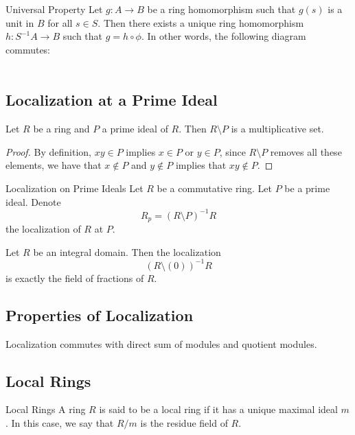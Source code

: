 \documentclass[a4paper]{article}
\begin{document}
\begin{thm}{Universal Property}{} Let $g:A\to B$ be a ring homomorphism such that $g(s)$ is a unit in $B$ for all $s\in S$. Then there exists a unique ring homomorphism $h:S^{-1}A\to B$ such that $g=h\circ\phi$. In other words, the following diagram commutes: \\~\\
\end{thm}

\subsection{Localization at a Prime Ideal}
\begin{lmm}{}{} Let $R$ be a ring and $P$ a prime ideal of $R$. Then $R\setminus P$ is a multiplicative set. \tcbline
\begin{proof}
By definition, $xy\in P$ implies $x\in P$ or $y\in P$, since $R\setminus P$ removes all these elements, we have that $x\notin P$ and $y\notin P$ implies that $xy\notin P$. 
\end{proof}
\end{lmm}

\begin{defn}{Localization on Prime Ideals}{} Let $R$ be a commutative ring. Let $P$ be a prime ideal. Denote $$R_p=(R\setminus P)^{-1}R$$ the localization of $R$ at $P$. 
\end{defn}

\begin{lmm}{}{} Let $R$ be an integral domain. Then the localization $$(R\setminus(0))^{-1}R$$ is exactly the field of fractions of $R$. 
\end{lmm}

\subsection{Properties of Localization}
\begin{prp}{}{} Localization commutes with direct sum of modules and quotient modules. 
\end{prp}

\subsection{Local Rings}
\begin{defn}{Local Rings}{} A ring $R$ is said to be a local ring if it has a unique maximal ideal $m$. In this case, we say that $R/m$ is the residue field of $R$. 
\end{defn}
\end{document}
